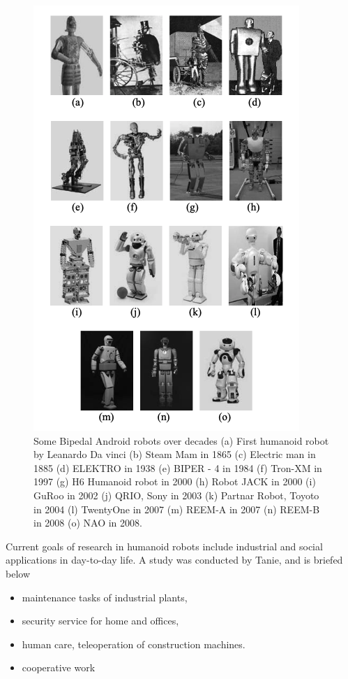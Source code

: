 \begin{figure}[h!]
\centering
\includegraphics[scale=0.6]{images/intro-3.png}\hfill
\caption[Humanoid robots over decades]{Some Bipedal Android robots over decades \cite{evolution} 
    (a) First humanoid robot by Leanardo Da vinci (b) Steam Mam in 1865 (c) Electric man in 1885 (d) 
    ELEKTRO in 1938 (e) BIPER - 4 in 1984 (f) Tron-XM in 1997 (g) H6 Humanoid robot in 2000 (h) Robot 
    JACK in 2000 (i)  GuRoo in 2002 (j) QRIO, Sony in 2003 (k) Partnar Robot, Toyoto in 2004 (l) TwentyOne
    in 2007 (m) REEM-A in 2007 (n) REEM-B in 2008 (o) NAO in 2008.}\hfill
\label{humanoid-robots}
\end{figure}


Current goals of research in humanoid robots include industrial and social applications in day-to-day life. 
A study was conducted by Tanie, \cite{tanie} and is briefed below

\begin{itemize}
\item maintenance tasks of industrial plants,
\item security service for home and offices,
\item human care, teleoperation of construction machines.
\item cooperative work
\end{itemize}


